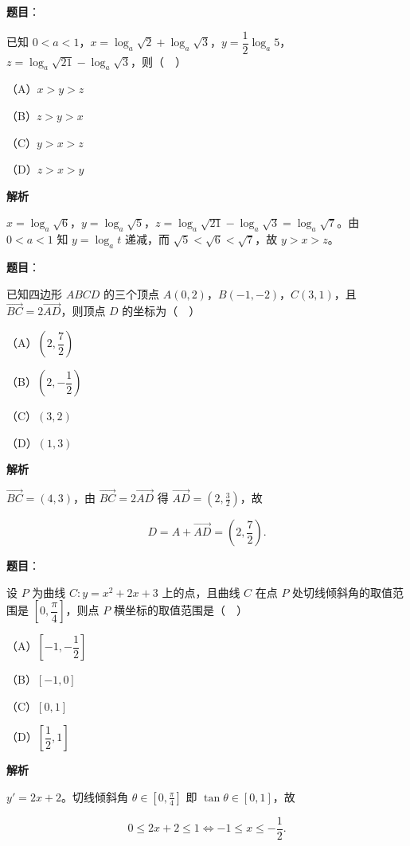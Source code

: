 \begin{answer}

\textbf{题目}：

已知 $0<a<1$，$x=\log_a\sqrt2+\log_a\sqrt3$，$y=\dfrac12\log_a5$，$z=\log_a\sqrt{21}-\log_a\sqrt3$，则（　）

（A）$x>y>z$

（B）$z>y>x$

（C）$y>x>z$

（D）$z>x>y$

\textbf{解析}

$x=\log_a\sqrt6$，$y=\log_a\sqrt5$，$z=\log_a\sqrt{21}-\log_a\sqrt3=\log_a\sqrt7$。由 $0<a<1$ 知 $y=\log_a t$ 递减，而 $\sqrt5<\sqrt6<\sqrt7$，故 $y>x>z$。


\end{answer}
\begin{answer}

\textbf{题目}：

已知四边形 $ABCD$ 的三个顶点 $A(0,2)$，$B(-1,-2)$，$C(3,1)$，且 $\overrightarrow{BC}=2\overrightarrow{AD}$，则顶点 $D$ 的坐标为（　）

（A）$\left(2,\dfrac72\right)$

（B）$\left(2,-\dfrac12\right)$

（C）$(3,2)$

（D）$(1,3)$

\textbf{解析}

$\overrightarrow{BC}=(4,3)$，由 $\overrightarrow{BC}=2\overrightarrow{AD}$ 得 $\overrightarrow{AD}=(2,\tfrac32)$，故

\nopagebreak[4]
\[D=A+\overrightarrow{AD}=\left(2,\frac72\right).\]


\end{answer}
\begin{answer}

\textbf{题目}：

设 $P$ 为曲线 $C:y=x^2+2x+3$ 上的点，且曲线 $C$ 在点 $P$ 处切线倾斜角的取值范围是 $\left[0,\dfrac{\pi}{4}\right]$，则点 $P$ 横坐标的取值范围是（　）

（A）$\left[-1,-\dfrac12\right]$

（B）$[-1,0]$

（C）$[0,1]$

（D）$\left[\dfrac12,1\right]$

\textbf{解析}

$y'=2x+2$。切线倾斜角 $\theta\in[0,\tfrac{\pi}{4}]$ 即 $\tan\theta\in[0,1]$，故

\nopagebreak[4]
\[0\leqslant 2x+2\leqslant 1\iff -1\leqslant x\leqslant-\frac12.\]


\end{answer}
